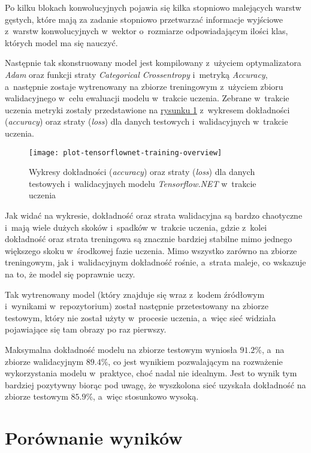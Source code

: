 Po kilku blokach konwolucyjnych pojawia się kilka stopniowo malejących warstw gęstych, które mają za zadanie stopniowo przetwarzać informacje wyjściowe z~warstw konwolucyjnych w~wektor o~rozmiarze odpowiadającym ilości klas, których model ma się nauczyć.

Następnie tak skonstruowany model jest kompilowany z~użyciem optymalizatora \emph{Adam} oraz funkcji straty \emph{Categorical Crossentropy} i~metryką \emph{Accuracy}, a~następnie zostaje wytrenowany na zbiorze treningowym z~użyciem zbioru walidacyjnego w~celu ewaluacji modelu w~trakcie uczenia.
Zebrane w~trakcie uczenia metryki zostały przedstawione na \hyperref[fig:plot-tensorflownet-training-overview]{rysunku \ref*{fig:plot-tensorflownet-training-overview}} z~wykresem dokładności (\emph{accuracy}) oraz straty (\emph{loss}) dla danych testowych i~walidacyjnych w~trakcie uczenia.

\begin{figure}[ht]
  \texttt{[image: plot-tensorflownet-training-overview]}
  \caption[Wykresy statystyk modelu Tensorflow.NET w~trakcie uczenia]{Wykresy dokładności (\emph{accuracy}) oraz straty (\emph{loss}) dla danych testowych i~walidacyjnych modelu \emph{Tensorflow.NET} w~trakcie uczenia}
  \label{fig:plot-tensorflownet-training-overview}
\end{figure}

Jak widać na wykresie, dokładność oraz strata walidacyjna są bardzo chaotyczne i~mają wiele dużych skoków i~spadków w~trakcie uczenia, gdzie z~kolei dokładność oraz strata treningowa są znacznie bardziej stabilne mimo jednego większego skoku w~środkowej fazie uczenia.
Mimo wszystko zarówno na zbiorze treningowym, jak i~walidacyjnym dokładność rośnie, a~strata maleje, co wskazuje na to, że model się poprawnie uczy.

Tak wytrenowany model (który znajduje się wraz z~kodem źródłowym i~wynikami w~repozytorium) został następnie przetestowany na zbiorze testowym, który nie został użyty w~procesie uczenia, a~więc sieć widziała pojawiające się tam obrazy po raz pierwszy.

Maksymalna dokładność modelu na zbiorze testowym wyniosła $91.2\%$, a~na zbiorze walidacyjnym $89.4\%$, co jest wynikiem pozwalającym na rozważenie wykorzystania modelu w~praktyce, choć nadal nie idealnym.
Jest to wynik tym bardziej pozytywny biorąc pod uwagę, że wyszkolona sieć uzyskała dokładność na zbiorze testowym $85.9\%$, a~więc stosunkowo wysoką.

\section{Porównanie wyników}

